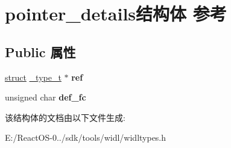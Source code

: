 \hypertarget{structpointer__details}{}\section{pointer\+\_\+details结构体 参考}
\label{structpointer__details}
\subsection*{Public 属性}
\begin{DoxyCompactItemize}
\item 
\mbox{\label{structpointer__details_a19e9aa94da478fee198ff10172fb8f83}} 
\hyperlink{interfacestruct}{struct} \hyperlink{struct__type__t}{\+\_\+type\+\_\+t} $\ast$ {\bfseries ref}
\item 
\mbox{\label{structpointer__details_a9a672a38bf25c59528279324bf358526}} 
unsigned char {\bfseries def\+\_\+fc}
\end{DoxyCompactItemize}


该结构体的文档由以下文件生成\+:\begin{DoxyCompactItemize}
\item 
E\+:/\+React\+O\+S-\/0../sdk/tools/widl/widltypes.\+h\end{DoxyCompactItemize}
